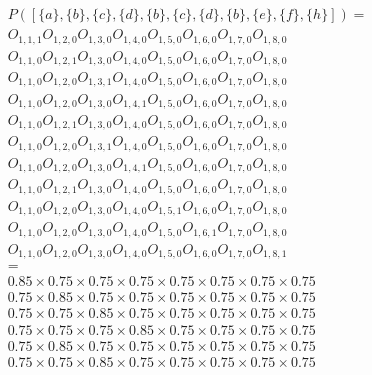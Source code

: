 \documentclass{article}
\begin{document}
$$
\begin{gathered}
P([\{a\}, \{b\}, \{c\}, \{d\}, \{b\}, \{c\}, \{d\}, \{b\}, \{e\}, \{f\}, \{h\}]) = \\
O_{1, 1, 1} O_{1, 2, 0}  O_{1, 3, 0}  O_{1, 4, 0}  O_{1, 5, 0}  O_{1, 6, 0}  O_{1, 7, 0}  O_{1, 8, 0} \\
O_{1, 1, 0} O_{1, 2, 1}  O_{1, 3, 0}  O_{1, 4, 0}  O_{1, 5, 0}  O_{1, 6, 0}  O_{1, 7, 0}  O_{1, 8, 0} \\
O_{1, 1, 0} O_{1, 2, 0}  O_{1, 3, 1}  O_{1, 4, 0}  O_{1, 5, 0}  O_{1, 6, 0}  O_{1, 7, 0}  O_{1, 8, 0} \\
O_{1, 1, 0} O_{1, 2, 0}  O_{1, 3, 0}  O_{1, 4, 1}  O_{1, 5, 0}  O_{1, 6, 0}  O_{1, 7, 0}  O_{1, 8, 0} \\
O_{1, 1, 0} O_{1, 2, 1}  O_{1, 3, 0}  O_{1, 4, 0}  O_{1, 5, 0}  O_{1, 6, 0}  O_{1, 7, 0}  O_{1, 8, 0} \\
O_{1, 1, 0} O_{1, 2, 0}  O_{1, 3, 1}  O_{1, 4, 0}  O_{1, 5, 0}  O_{1, 6, 0}  O_{1, 7, 0}  O_{1, 8, 0} \\
O_{1, 1, 0} O_{1, 2, 0}  O_{1, 3, 0}  O_{1, 4, 1}  O_{1, 5, 0}  O_{1, 6, 0}  O_{1, 7, 0}  O_{1, 8, 0} \\
O_{1, 1, 0} O_{1, 2, 1}  O_{1, 3, 0}  O_{1, 4, 0}  O_{1, 5, 0}  O_{1, 6, 0}  O_{1, 7, 0}  O_{1, 8, 0} \\
O_{1, 1, 0} O_{1, 2, 0}  O_{1, 3, 0}  O_{1, 4, 0}  O_{1, 5, 1}  O_{1, 6, 0}  O_{1, 7, 0}  O_{1, 8, 0} \\
O_{1, 1, 0} O_{1, 2, 0}  O_{1, 3, 0}  O_{1, 4, 0}  O_{1, 5, 0}  O_{1, 6, 1}  O_{1, 7, 0}  O_{1, 8, 0} \\
O_{1, 1, 0} O_{1, 2, 0}  O_{1, 3, 0}  O_{1, 4, 0}  O_{1, 5, 0}  O_{1, 6, 0}  O_{1, 7, 0}  O_{1, 8, 1} \\
= \\
0.85 \times 0.75 \times 0.75 \times 0.75 \times 0.75 \times 0.75 \times 0.75 \times 0.75 \\
0.75 \times 0.85 \times 0.75 \times 0.75 \times 0.75 \times 0.75 \times 0.75 \times 0.75 \\
0.75 \times 0.75 \times 0.85 \times 0.75 \times 0.75 \times 0.75 \times 0.75 \times 0.75 \\
0.75 \times 0.75 \times 0.75 \times 0.85 \times 0.75 \times 0.75 \times 0.75 \times 0.75 \\
0.75 \times 0.85 \times 0.75 \times 0.75 \times 0.75 \times 0.75 \times 0.75 \times 0.75 \\
0.75 \times 0.75 \times 0.85 \times 0.75 \times 0.75 \times 0.75 \times 0.75 \times 0.75 \\

\end{gathered}$$
\end{document}

